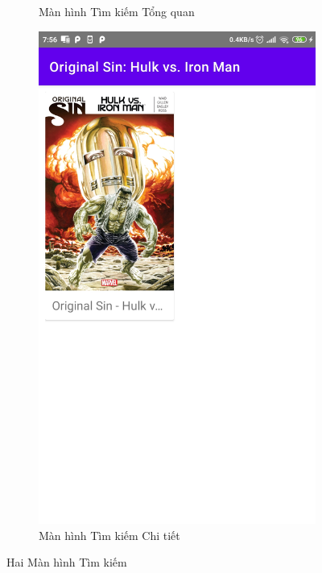 \documentclass[../../thesis]{subfiles}
\begin{document}
\begin{figure}[H]
\begin{subfigure}[b]{0.49\textwidth}
        \caption{Màn hình Tìm kiếm Tổng quan}
        \label{fig:search_overall_screen}
    \end{subfigure}
    \hfill
    \begin{subfigure}[b]{0.49\textwidth}
        \centering
        \includegraphics[scale=0.12]{../images/Screenshot_2021-05-25-07-56-08-965_com.uet.nvmnghia.yacv}
        \caption{Màn hình Tìm kiếm Chi tiết}
        \label{fig:search_detail_screen}
    \end{subfigure}
    \caption{Hai Màn hình Tìm kiếm}
    \label{fig:2-searching-screens}
\end{figure}
\end{document}
